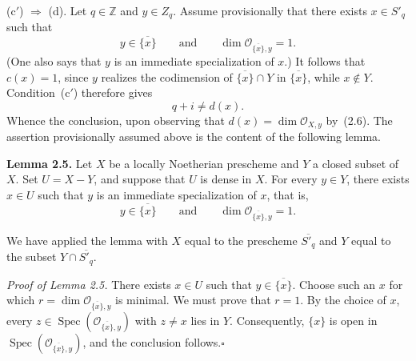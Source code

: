 \documentclass[10pt,a4paper]{article}
\newcommand{\cO}{\mathcal O}
\newcommand{\Spec}{\operatorname{Spec}}
\begin{document}
\smallskip
\noindent\textup{(c$'$)} $\Rightarrow$ \textup{(d)}. Let $q\in\mathbb Z$
and $y\in Z_q$. Assume provisionally that there exists $x\in S'_q$ such
that
\[
  y\in\overline{\{x\}}\qquad\text{and}\qquad
  \dim\cO_{\overline{\{x\}},y}=1.
\]
(One also says that $y$ is an immediate specialization of $x$.) It follows
that $c(x)=1$, since $y$ realizes the codimension of
$\overline{\{x\}}\cap Y$ in $\overline{\{x\}}$, while $x\notin Y$.
Condition~\textup{(c$'$)} therefore gives
\[
  q+i\ne d(x).
\]
Whence the conclusion, upon observing that $d(x)=\dim\cO_{X,y}$ by~(2.6).
The assertion provisionally assumed above is the content of the following
lemma.

\medskip
\noindent\textbf{Lemma 2.5.} Let $X$ be a locally Noetherian prescheme and
$Y$ a closed subset of $X$. Set $U=X-Y$, and suppose that $U$ is dense in
$X$. For every $y\in Y$, there exists $x\in U$ such that $y$ is an immediate
specialization of $x$, that is,
\[
  y\in\overline{\{x\}}\qquad\text{and}\qquad
  \dim\cO_{\overline{\{x\}},y}=1.
\]

We have applied the lemma with $X$ equal to the prescheme
$\overline{S'_q}$ and $Y$ equal to the subset
$Y\cap\overline{S'_q}$.

\medskip
\noindent\textit{Proof of Lemma 2.5.} There exists $x\in U$ such that
$y\in\overline{\{x\}}$. Choose such an $x$ for which
$r=\dim\cO_{\overline{\{x\}},y}$ is minimal. We must prove that $r=1$.
By the choice of $x$, every
$z\in\Spec(\cO_{\overline{\{x\}},y})$ with $z\ne x$ lies in $Y$.
Consequently, $\{x\}$ is open in
$\Spec(\cO_{\overline{\{x\}},y})$, and the conclusion follows.\hfill$\square$
\end{document}
